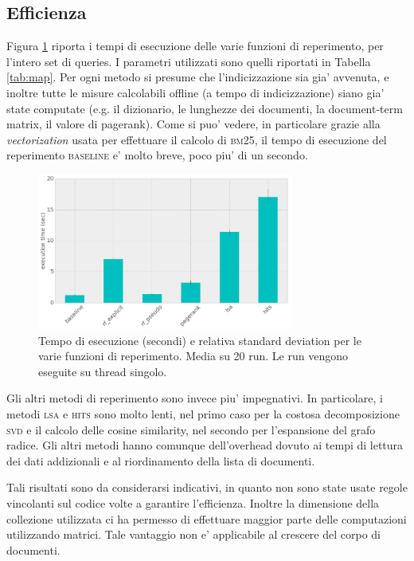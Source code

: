 \subsection{Efficienza}
\label{sec:efficienza}
Figura \ref{fig:efficiency} riporta i tempi di esecuzione delle varie funzioni di reperimento, per l'intero set di queries. I parametri utilizzati sono quelli riportati in Tabella \ref{tab:map}. Per ogni metodo si presume che l'indicizzazione sia gia' avvenuta, e inoltre tutte le misure calcolabili offline (a tempo di indicizzazione) siano gia' state computate (e.g. il dizionario, le lunghezze dei documenti, la document-term matrix, il valore di pagerank). Come si puo' vedere, in particolare grazie alla \textit{vectorization} usata per effettuare il calcolo di \textsc{bm25}, il tempo di esecuzione del reperimento \textsc{baseline} e' molto breve, poco piu' di un secondo. 
\begin{figure}[htpb]
	\begin{center}
		\includegraphics[width=0.75\textwidth]{figures/efficiency.png}
		\caption{Tempo di esecuzione (secondi) e relativa standard deviation per le varie funzioni di reperimento. Media su 20 run. Le run vengono eseguite su thread singolo.}
		\label{fig:efficiency}
	\end{center}
\end{figure}
Gli altri metodi di reperimento sono invece piu' impegnativi. In particolare, i metodi \textsc{lsa} e \textsc{hits} sono molto lenti, nel primo caso per la costosa decomposizione \textsc{svd} e il calcolo delle cosine similarity, nel secondo per l'espansione del grafo radice. Gli altri metodi hanno comunque dell'overhead dovuto ai tempi di lettura dei dati addizionali e al riordinamento della lista di documenti.

Tali risultati sono da considerarsi indicativi, in quanto non sono state usate regole vincolanti sul codice volte a garantire l'efficienza. Inoltre la dimensione della collezione  utilizzata ci ha permesso di effettuare maggior parte delle computazioni utilizzando matrici. Tale vantaggio non e' applicabile al crescere del corpo di documenti.

